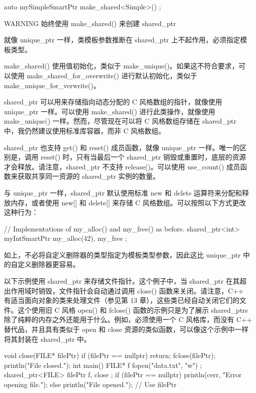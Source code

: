 \begin{cpp}
auto mySimpleSmartPtr { make_shared<Simple>() };
\end{cpp}

\begin{myWarning}{WARNING}
始终使用 make\_shared() 来创建 shared\_ptr
\end{myWarning}

就像 unique\_ptr 一样，类模板参数推断在 shared\_ptr 上不起作用，必须指定模板类型。

make\_shared() 使用值初始化，类似于 make\_unique()。如果这不符合要求，可以使用 make\_shared\_for\_overwrite() 进行默认初始化，类似于 make\_unique\_for\_verwrite()。

shared\_ptr 可以用来存储指向动态分配的 C 风格数组的指针，就像使用 unique\_ptr 一样。可以使用 make\_shared() 进行此类操作，就像使用 make\_unique() 一样。然而，尽管现在可以将 C 风格数组存储在 shared\_ptr 中，我仍然建议使用标准库容器，而非 C 风格数组。

shared\_ptr 也支持 get() 和 reset() 成员函数，就像 unique\_ptr 一样。唯一的区别是，调用 reset() 时，只有当最后一个 shared\_ptr 销毁或重置时，底层的资源才会释放。请注意，shared\_ptr 不支持 release()。可以使用 use\_count() 成员函数来获取共享同一资源的 shared\_ptr 实例的数量。

与 unique\_ptr 一样，shared\_ptr 默认使用标准 new 和 delete 运算符来分配和释放内存，或者使用 new[] 和 delete[] 来存储 C 风格数组。可以按照以下方式更改这种行为：

\begin{cpp}
// Implementations of my_alloc() and my_free() as before.
shared_ptr<int> myIntSmartPtr { my_alloc(42), my_free };
\end{cpp}

如上，不必将自定义删除器的类型指定为模板类型参数，因此这比 unique\_ptr 中的自定义删除器更容易。

以下示例使用 shared\_ptr 来存储文件指针。这个例子中，当 shared\_ptr 在其超出作用域时销毁，文件指针会自动通过调用 close() 函数来关闭。请注意，C++ 有适当面向对象的类来处理文件（参见第 13 章），这些类已经自动关闭它们的文件。这个使用旧 C 风格 open() 和 fclose() 函数的示例只是为了展示 shared\_ptrs 除了纯粹的内存之外还能用于什么。例如，必须使用一个 C 风格库，而没有 C++ 替代品，并且具有类似于 open 和 close 资源的类似函数，可以像这个示例中一样将其封装在 shared\_ptr 中。

\begin{cpp}
void close(FILE* filePtr)
{
    if (filePtr == nullptr) { return; }
    fclose(filePtr);
    println("File closed.");
}
int main()
{
    FILE* f { fopen("data.txt", "w") };
    shared_ptr<FILE> filePtr { f, close };
    if (filePtr == nullptr) {
        println(cerr, "Error opening file.");
    } else {
        println("File opened.");
        // Use filePtr
    }
}
\end{cpp}


